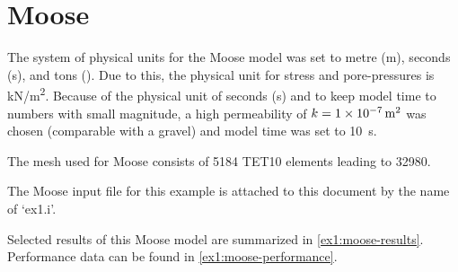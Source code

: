 \section{Moose}

The system of physical units for the Moose model was set to metre
(\unit{\metre}), seconds (\unit{\second}), and tons (\unit{\ton}).
Due to this, the physical unit for stress and pore-pressures is
\unit[per-mode = symbol]{\kilo\newton\per\square\metre}. Because
of the physical unit of seconds (\unit{\second}) and to keep model
time to numbers with small magnitude, a high permeability of
$k = \qty{1E-7}{\square\metre}$ was chosen (comparable with a gravel)
and model time was set to \qty{10}{\second}.

The mesh used for Moose consists of \qty{5184}{} TET10 elements leading to
\qty{32980}{\DOF}.

The Moose input file for this example is attached to this document by the
name of ‘ex1.i’. 

Selected results of this Moose model are summarized in \autoref{ex1:moose-results}.
Performance data can be found in \autoref{ex1:moose-performance}.

